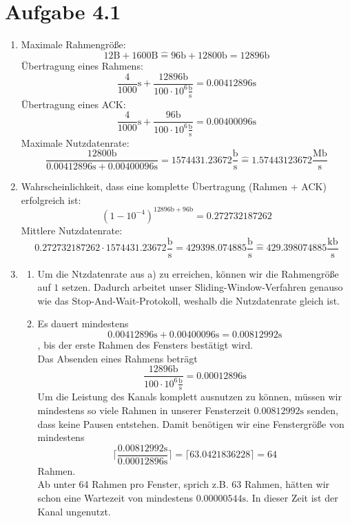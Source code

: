 \documentclass[12pt, a4paper]{article}
\begin{document}
\section*{Aufgabe 4.1}
\begin{enumerate}[label=\alph*)]
	\item	Maximale Rahmengröße: $$12 \text{B} + 1600 \text{B} \hat{=} 96 \text{b} + 12800 \text{b} = 12896 \text{b}$$
			Übertragung eines Rahmens: $$\frac{4}{1000} \text{s} + \frac{12896 \text{b}}{100 \cdot 10^6 \frac{\text{b}}{\text{s}}} = 0.00412896 \text{s}$$
			Übertragung eines ACK: $$\frac{4}{1000} \text{s} + \frac{96 \text{b}}{100 \cdot 10^6 \frac{\text{b}}{\text{s}}} = 0.00400096 \text{s}$$
			Maximale Nutzdatenrate: $$\frac{12800 \text{b}}{0.00412896 \text{s} + 0.00400096 \text{s}} = 1574431.23672 \frac{\text{b}}{\text{s}} \hat{=} 1.57443123672 \frac{\text{Mb}}{\text{s}}$$
	\item	Wahrscheinlichkeit, dass eine komplette Übertragung (Rahmen + ACK) erfolgreich ist: $$(1 - 10^{-4})^{12896 \text{b} + 96 \text{b}} = 0.272732187262$$
			Mittlere Nutzdatenrate: $$0.272732187262 \cdot 1574431.23672 \frac{\text{b}}{\text{s}} = 429398.074885 \frac{\text{b}}{\text{s}} \hat{=} 429.398074885 \frac{\text{kb}}{\text{s}}$$
	\item	\begin{enumerate}[label=\roman*)]
				\item	Um die Ntzdatenrate aus a) zu erreichen, können wir die Rahmengröße auf $1$ setzen. Dadurch arbeitet unser Sliding-Window-Verfahren genauso wie das Stop-And-Wait-Protokoll, weshalb die Nutzdatenrate gleich ist.
				\item	Es dauert mindestens $$0.00412896 \text{s} + 0.00400096 \text{s} = 0.00812992 \text{s}$$, bis der erste Rahmen des Fensters bestätigt wird.\\
						Das Absenden eines Rahmens beträgt $$\frac{12896 \text{b}}{100 \cdot 10^6 \frac{\text{b}}{\text{s}}} = 0.00012896 \text{s}$$
						Um die Leistung des Kanals komplett ausnutzen zu können, müssen wir mindestens so viele Rahmen in unserer Fensterzeit $0.00812992 \text{s}$ senden, dass keine Pausen entstehen. Damit benötigen wir eine Fenstergröße von mindestens 
						$$\lceil \frac{0.00812992 \text{s}}{0.00012896 \text{s}} \rceil = \lceil 63.0421836228 \rceil = 64$$
						Rahmen.\\
						Ab unter 64 Rahmen pro Fenster, sprich z.B. 63 Rahmen, hätten wir schon eine Wartezeit von mindestens $0.00000544 \text{s}$. In dieser Zeit ist der Kanal ungenutzt.
			\end{enumerate}
\end{enumerate}
\end{document}
